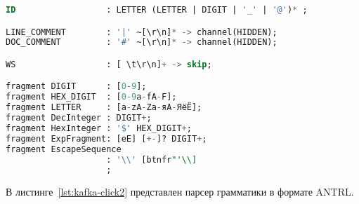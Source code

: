 \begin{lstlisting}[language=sql, caption={Лексер грамматики в формате ANTRL}, label=lst:kafka-click]
ID                  : LETTER (LETTER | DIGIT | '_' | '@')* ;

LINE_COMMENT        : '|' ~[\r\n]* -> channel(HIDDEN);
DOC_COMMENT         : '#' ~[\r\n]* -> channel(HIDDEN);

WS                  : [ \t\r\n]+ -> skip;

fragment DIGIT      : [0-9];
fragment HEX_DIGIT  : [0-9a-fA-F];
fragment LETTER     : [a-zA-Zа-яА-ЯёЁ];
fragment DecInteger : DIGIT+;
fragment HexInteger : '$' HEX_DIGIT+;
fragment ExpFragment: [eE] [+-]? DIGIT+;
fragment EscapeSequence
                    : '\\' [btnfr"'\\]
                    ;
\end{lstlisting}

В листинге~\ref{lst:kafka-click2} представлен парсер грамматики в формате ANTRL.

